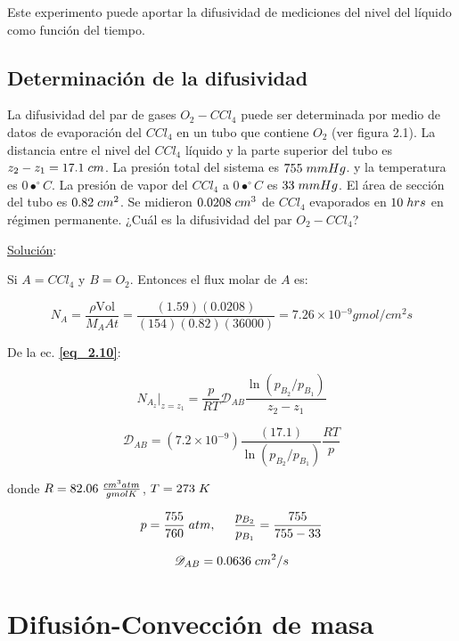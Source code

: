 Este experimento puede aportar la difusividad de mediciones del nivel del líquido como función del tiempo.

\subsection{Determinación de la difusividad}

La difusividad del par de gases $O_2 - CCl_4$ puede ser determinada por medio de datos de evaporación del $CCl_4$ en un tubo que contiene $O_2$ (ver figura 2.1). La distancia entre el nivel del $CCl_4$ líquido y la parte superior del tubo es $z_2 - z_1 = 17.1 \hspace{0.1cm} cm$. La presión total del sistema es $755 \hspace{0.1cm} mmHg$. y la temperatura es $0•^\circ C$. La presión de vapor del $CCl_4$ a $0•^\circ C$ es $33 \hspace{0.1cm} mmHg$. El área de sección del tubo es $0.82 \hspace{0.1cm} cm^2$. Se midieron $0.0208 \hspace{0.1cm} cm^3$ de $CCl_4$ evaporados en $10 \hspace{0.1cm} hrs$ en régimen permanente. ¿Cuál es la difusividad del par $O_2 - CCl_4$?

\underline{Solución}:

Si $A=CCl_4$ y $B=O_2$. Entonces el flux molar de $A$ es:

$$N_A = \frac{\rho \text{Vol}}{M_A At} = \frac{(1.59)(0.0208)}{(154)(0.82)(36000)} = 7.26 \times 10­^{-9} gmol/cm^2 s$$ 

De la ec. \textbf{\eqref{eq_2.10}}:

$$N_{A_z} | _{z=z_1} = \frac{p}{RT} \mathscr{D}_{AB} \frac{\ln{(p_{B_2}/p_{B_1})}}{z_2 - z_1}$$

$$\mathscr{D}_{AB} = (7.2 \times 10^{-9})\frac{(17.1)}{\ln{(p_{B_2}/p_{B_1})}} \frac{RT}{p}$$

donde $R = 82.06 \hspace{0.1cm} \frac{cm^3 atm}{gmol K}$, $T = 273 \hspace{0.1cm} K$

$$p = \frac{755}{760} \hspace{0.1cm} atm , \hspace{0.5cm} \frac{p_{B_2}}{p_{B_1}} = \frac{755}{755-33}$$

$$\mathscr{D}_{AB} = 0.0636 \hspace{0.1cm} cm^2/s$$
	
\section{Difusión-Convección de masa}

